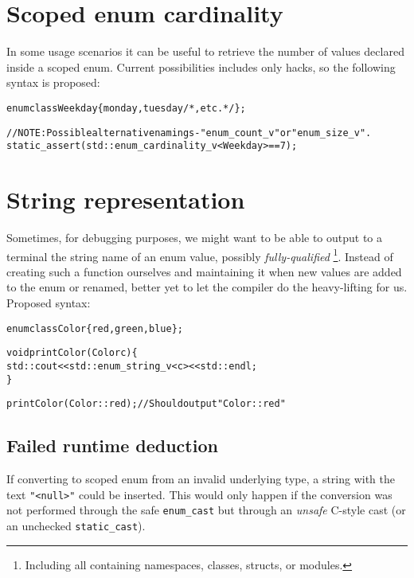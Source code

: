 \documentclass[a4paper, 12pt]{article}
\begin{document}
\section{Scoped enum cardinality}

In some usage scenarios it can be useful to retrieve the number of values
declared inside a scoped enum. Current possibilities includes only hacks,
so the following syntax is proposed:

\begin{alltt}\footnotesize
enum class Weekday \{ monday, tuesday /*, etc. */ \};

// NOTE: Possible alternative namings - "enum\_count\_v" or "enum\_size\_v".
static\_assert(std::enum\_cardinality\_v<Weekday> == 7);
\end{alltt}



\section{String representation}

Sometimes, for debugging purposes, we might want to be able to output to a
terminal the string name of an enum value, possibly \textit{fully-qualified}
\footnote{Including all containing namespaces, classes, structs, or modules.}.
Instead of creating such a function ourselves and maintaining it when new
values are added to the enum or renamed, better yet to let the compiler do
the heavy-lifting for us. Proposed syntax:

\begin{alltt}\footnotesize
enum class Color \{ red, green, blue \};

void printColor(Color c) \{
  std::cout << std::enum\_string\_v<c> << std::endl;
\}

printColor(Color::red); // Should output "Color::red"
\end{alltt}


\subsection{Failed runtime deduction}

If converting to scoped enum from an invalid underlying type, a string with
the text \texttt{"<null>"} could be inserted. This would only happen if the
conversion was not performed through the safe \texttt{enum\_cast} but through
an \textit{unsafe} C-style cast (or an unchecked \texttt{static\_cast}).\\
\end{document}
